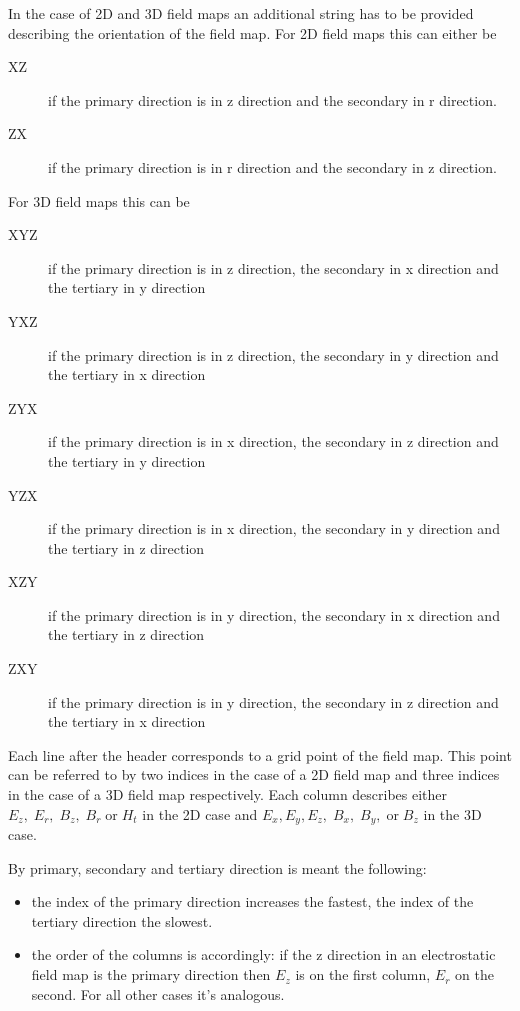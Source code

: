 In the case of 2D and 3D field maps an additional string has to be provided describing the orientation of the field map. For 2D field maps this can either be 
\begin{description}
\item[XZ]
if the primary direction is in z direction and the secondary in r direction.
\item[ZX]
if the primary direction is in r direction and the secondary in z direction.
\end{description}
For 3D field maps this can be
\begin{description}
\item[XYZ]
if the primary direction is in z direction, the secondary in x direction and the tertiary in y direction
\item[YXZ]
if the primary direction is in z direction, the secondary in y direction and the tertiary in x direction
\item[ZYX]
if the primary direction is in x direction, the secondary in z direction and the tertiary in y direction
\item[YZX]
if the primary direction is in x direction, the secondary in y direction and the tertiary in z direction
\item[XZY]
if the primary direction is in y direction, the secondary in x direction and the tertiary in z direction
\item[ZXY]
if the primary direction is in y direction, the secondary in z direction and the tertiary in x direction
\end{description}
Each line after the header corresponds to a grid point of the field map. This point can be referred to by two indices in the case of a 2D field map and three indices in the case of a 3D field map respectively. Each column describes either $E_z,\; E_r,\; B_z,\; B_r\; \text{or}\;H_t$ in the 2D case and $E_x, E_y, E_z,\; B_x,\; B_y,\;\text{or}\; B_z$ in the 3D case.

By primary, secondary and tertiary direction is meant the following:
\begin{itemize}
\item
the index of the primary direction increases the fastest, the index of the tertiary direction the slowest. 
\item
the order of the columns is accordingly: if the z direction in an electrostatic field map is the primary direction then $E_z$ is on the first column, $E_r$ on the second. For all other cases it's analogous.
\end{itemize}

